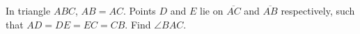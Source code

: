 In triangle $ABC$, $AB=AC$. Points $D$ and $E$ lie on $\overline{AC}$ and $\overline{AB}$ respectively, such that $AD=DE=EC=CB$. Find $\angle BAC$.
